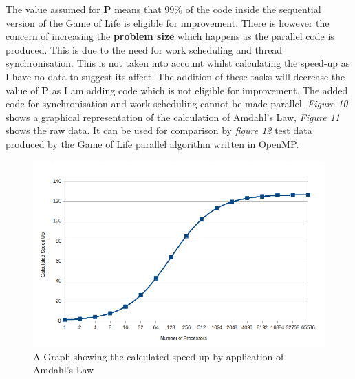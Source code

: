\documentclass[11pt]{article} %
\begin{document}
The value assumed for {\bf P} means that 99\% of the code inside the sequential version of the Game of Life is eligible for improvement. There is however the concern of increasing the {\bf problem size} which happens as the parallel code is produced. This is due to the need for work scheduling and thread synchronisation. This is not taken into account whilst calculating the speed-up as I have no data to suggest its affect. The addition of these tasks will decrease the value of {\bf P} as I am adding code which is not eligible for improvement. The added code for synchronisation and work scheduling cannot be made parallel. {\it Figure 10} shows a graphical representation of the calculation of Amdahl's Law, {\it Figure 11} shows the raw data. It can be used for comparison by {\it figure 12} test data produced by the Game of Life parallel algorithm written in OpenMP.
\begin{figure}[h]
\centering
\includegraphics[scale=0.5]{Amdahl.png}
\caption{A Graph showing the calculated speed up by application of Amdahl's Law}
\label{fig: AmdahlGraph}
\end{figure}
\end{document}

